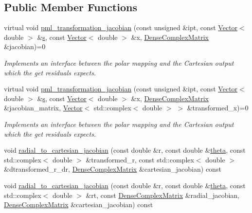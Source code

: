 \subsection*{Public Member Functions}
\begin{DoxyCompactItemize}
\item 
virtual void \hyperlink{classoomph_1_1AnnularPMLElementBase_a2f79efade3e4be24515b2960f447e10e}{pml\+\_\+transformation\+\_\+jacobian} (const unsigned \&ipt, const \hyperlink{classoomph_1_1Vector}{Vector}$<$ double $>$ \&\hyperlink{cfortran_8h_ab7123126e4885ef647dd9c6e3807a21c}{s}, const \hyperlink{classoomph_1_1Vector}{Vector}$<$ double $>$ \&x, \hyperlink{classoomph_1_1DenseComplexMatrix}{Dense\+Complex\+Matrix} \&jacobian)=0
\begin{DoxyCompactList}\small\item\em Implements an interface between the polar mapping and the Cartesian output which the get residuals expects. \end{DoxyCompactList}\item 
virtual void \hyperlink{classoomph_1_1AnnularPMLElementBase_a071a64f7677e50ee93c5c568ca59fff2}{pml\+\_\+transformation\+\_\+jacobian} (const unsigned \&ipt, const \hyperlink{classoomph_1_1Vector}{Vector}$<$ double $>$ \&\hyperlink{cfortran_8h_ab7123126e4885ef647dd9c6e3807a21c}{s}, const \hyperlink{classoomph_1_1Vector}{Vector}$<$ double $>$ \&x, \hyperlink{classoomph_1_1DenseComplexMatrix}{Dense\+Complex\+Matrix} \&jacobian\+\_\+matrix, \hyperlink{classoomph_1_1Vector}{Vector}$<$ std\+::complex$<$ double $>$ $>$ \&transformed\+\_\+x)=0
\begin{DoxyCompactList}\small\item\em Implements an interface between the polar mapping and the Cartesian output which the get residuals expects. \end{DoxyCompactList}\item 
void \hyperlink{classoomph_1_1AnnularPMLElementBase_a5e8b3cd8afddc6405af4d686afb578be}{radial\+\_\+to\+\_\+cartesian\+\_\+jacobian} (const double \&r, const double \&\hyperlink{classoomph_1_1AnnularPMLElementBase_a74036190f87f79129cdcda562664dd18}{theta}, const std\+::complex$<$ double $>$ \&transformed\+\_\+r, const std\+::complex$<$ double $>$ \&dtransformed\+\_\+r\+\_\+dr, \hyperlink{classoomph_1_1DenseComplexMatrix}{Dense\+Complex\+Matrix} \&cartesian\+\_\+jacobian) const
\item 
void \hyperlink{classoomph_1_1AnnularPMLElementBase_a584becc7b1b83823c334704117b3de12}{radial\+\_\+to\+\_\+cartesian\+\_\+jacobian} (const double \&r, const double \&\hyperlink{classoomph_1_1AnnularPMLElementBase_a74036190f87f79129cdcda562664dd18}{theta}, const std\+::complex$<$ double $>$ \&rt, const \hyperlink{classoomph_1_1DenseComplexMatrix}{Dense\+Complex\+Matrix} \&radial\+\_\+jacobian, \hyperlink{classoomph_1_1DenseComplexMatrix}{Dense\+Complex\+Matrix} \&cartesian\+\_\+jacobian) const

\end{DoxyCompactItemize}
